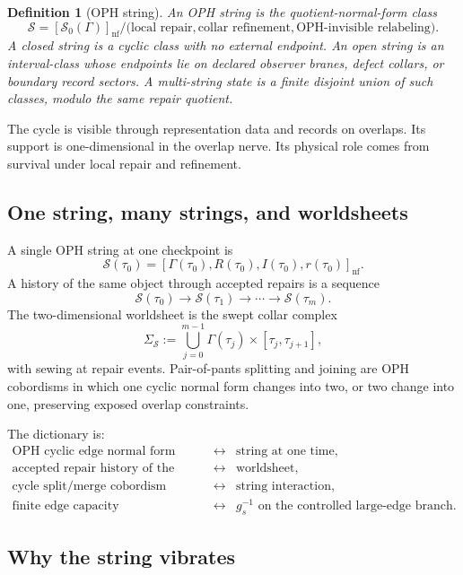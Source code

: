 \documentclass[11pt]{article}
\newtheorem{definition}[theorem]{Definition}
\theoremstyle{remark}
\theoremstyle{plain}
\begin{document}
\begin{definition}[OPH string]
An OPH string is the quotient-normal-form class
\[
\mathcal S=[\mathcal S_0(\Gamma)]_{\mathrm{nf}}/
\bigl(\text{local repair},\text{collar refinement},\text{OPH-invisible relabeling}\bigr).
\]
A closed string is a cyclic class with no external endpoint. An open string is an interval-class
whose endpoints lie on declared observer branes, defect collars, or boundary record sectors. A
multi-string state is a finite disjoint union of such classes, modulo the same repair quotient.
\end{definition}

The cycle is visible through representation data and records on overlaps. Its support is
one-dimensional in the overlap nerve. Its physical role comes from survival under local repair
and refinement.

\subsection{One string, many strings, and worldsheets}

A single OPH string at one checkpoint is
\[
\mathcal S(\tau_0)=[\Gamma(\tau_0),R(\tau_0),I(\tau_0),r(\tau_0)]_{\mathrm{nf}}.
\]
A history of the same object through accepted repairs is a sequence
\[
\mathcal S(\tau_0)\to \mathcal S(\tau_1)\to\cdots\to\mathcal S(\tau_m).
\]
The two-dimensional worldsheet is the swept collar complex
\[
\Sigma_{\mathcal S}:=\bigcup_{j=0}^{m-1}\Gamma(\tau_j)\times[\tau_j,\tau_{j+1}],
\]
with sewing at repair events. Pair-of-pants splitting and joining are OPH cobordisms in which one
cyclic normal form changes into two, or two change into one, preserving exposed overlap
constraints.

The dictionary is:
\[
\begin{array}{ccl}
\text{OPH cyclic edge normal form} &\longleftrightarrow& \text{string at one time},\\
\text{accepted repair history of the cycle} &\longleftrightarrow& \text{worldsheet},\\
\text{cycle split/merge cobordism} &\longleftrightarrow& \text{string interaction},\\
\text{finite edge capacity} &\longleftrightarrow& g_s^{-1}\text{ on the controlled large-edge branch}.
\end{array}
\]

\subsection{Why the string vibrates}
\end{document}
